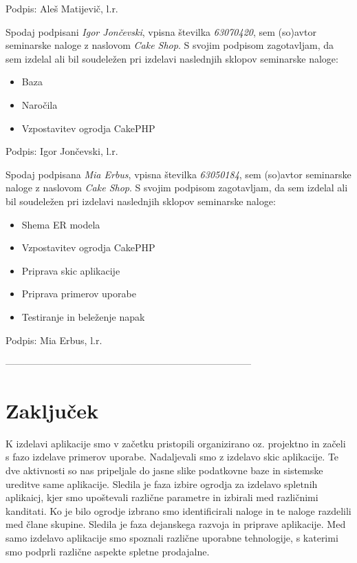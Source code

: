 \documentclass[a4paper,12pt]{report}
\newcommand{\naslov}     {Cake Shop}
\newcommand{\prviavtor}  {Aleš Matijevič}
\newcommand{\drugiavtor} {Igor Jončevski}
\newcommand{\drugiindeks}{63070420}
\newcommand{\tretjiavtor}{Mia Erbus}
\newcommand{\tretjiindeks}{63050184}
\begin{document}
Podpis: {\prviavtor}, l.r.

\newpage

Spodaj podpisani \textit{\drugiavtor}, vpisna številka \textit{\drugiindeks}, sem (so)avtor seminarske naloge z naslovom \textit{\naslov}. S svojim podpisom zagotavljam, da sem izdelal ali bil soudeležen pri izdelavi naslednjih sklopov seminarske naloge:
\begin{itemize}
    \item Baza
    \item Naročila
    \item Vzpostavitev ogrodja CakePHP
\end{itemize}

Podpis: {\drugiavtor}, l.r.

\newpage

Spodaj podpisana \textit{\tretjiavtor}, vpisna številka \textit{\tretjiindeks}, sem (so)avtor seminarske naloge z naslovom \textit{\naslov}. S svojim podpisom zagotavljam, da sem izdelal ali bil soudeležen pri izdelavi naslednjih sklopov seminarske naloge:
\begin{itemize}
	\item Shema ER modela
    \item Vzpostavitev ogrodja CakePHP
    \item Priprava skic aplikacije
    \item Priprava primerov uporabe
    \item Testiranje in beleženje napak
\end{itemize}

Podpis: {\tretjiavtor}, l.r.

 -----------------------------------------------------------------------------
\chapter{Zaključek}

K izdelavi aplikacije smo v začetku pristopili organizirano oz. projektno in začeli s fazo izdelave primerov uporabe. Nadaljevali smo z izdelavo skic aplikacije. Te dve aktivnosti so nas pripeljale do jasne slike podatkovne baze in sistemske ureditve same aplikacije. Sledila je faza izbire ogrodja za izdelavo spletnih aplikaicj, kjer smo upoštevali različne parametre in izbirali med različnimi kanditati. Ko je bilo ogrodje izbrano smo identificirali naloge in te naloge razdelili med člane skupine. Sledila je faza dejanskega razvoja in priprave aplikacije. Med samo izdelavo aplikacije smo spoznali različne uporabne tehnologije, s katerimi smo podprli različne aspekte spletne prodajalne. 
\end{document}
